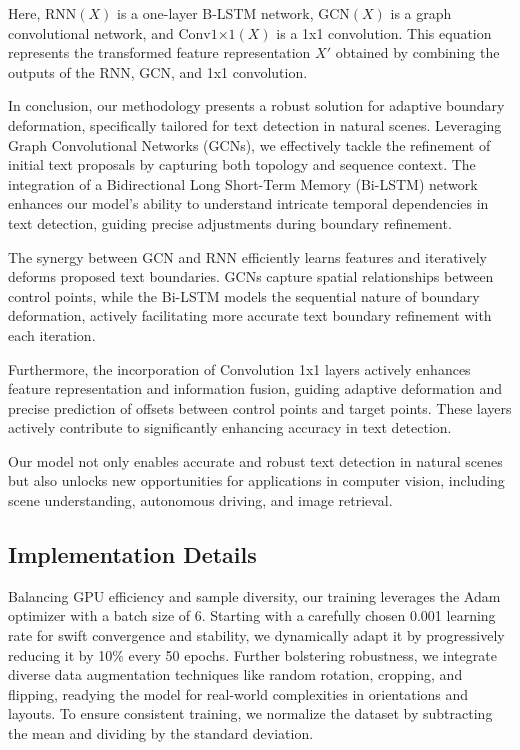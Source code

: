 \documentclass[default,iicol]{sn-jnl}%
\begin{document}
Here, $\text{{RNN}}(X)$ is a one-layer B-LSTM network, $\text{{GCN}}(X)$ is a graph convolutional network, and $\text{{Conv1×1}}(X)$ is a 1x1 convolution. This equation represents the transformed feature representation $X'$ obtained by combining the outputs of the RNN, GCN, and 1x1 convolution.

In conclusion, our methodology presents a robust solution for adaptive boundary deformation, specifically tailored for text detection in natural scenes. Leveraging Graph Convolutional Networks (GCNs), we effectively tackle the refinement of initial text proposals by capturing both topology and sequence context. The integration of a Bidirectional Long Short-Term Memory (Bi-LSTM) network enhances our model's ability to understand intricate temporal dependencies in text detection, guiding precise adjustments during boundary refinement.

The synergy between GCN and RNN efficiently learns features and iteratively deforms proposed text boundaries. GCNs capture spatial relationships between control points, while the Bi-LSTM models the sequential nature of boundary deformation, actively facilitating more accurate text boundary refinement with each iteration.

Furthermore, the incorporation of Convolution 1x1 layers actively enhances feature representation and information fusion, guiding adaptive deformation and precise prediction of offsets between control points and target points. These layers actively contribute to significantly enhancing accuracy in text detection.

Our model not only enables accurate and robust text detection in natural scenes but also unlocks new opportunities for applications in computer vision, including scene understanding, autonomous driving, and image retrieval.

\subsection{Implementation Details}
Balancing GPU efficiency and sample diversity, our training leverages the Adam optimizer with a batch size of 6. Starting with a carefully chosen 0.001 learning rate for swift convergence and stability, we dynamically adapt it by progressively reducing it by 10\% every 50 epochs. Further bolstering robustness, we integrate diverse data augmentation techniques like random rotation, cropping, and flipping, readying the model for real-world complexities in orientations and layouts. To ensure consistent training, we normalize the dataset by subtracting the mean and dividing by the standard deviation.
\end{document}

